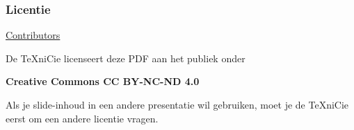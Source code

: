 \def\acrnCopyrightline#1#2#3{%
	\item Copyright (c) #2 \textbf{#1}\relax
}

\acrnPrepare

\resetul

\begin{frame}
	\frametitle{Licentie}

	\begin{center}
		\ul{Contributors}\medskip

		\adjustbox{scale=0.8,set depth={0.4\textheight}}{%
			\begin{varwidth}{25em}%
				\ttfamily
				\begin{list}{}{
					\setlength{\leftmargin}{20pt}
					\itemindent-\leftmargin
					\setlength{\itemsep}{0pt}
					\setlength{\parskip}{0pt}
				}
					\copyrightlines
				\end{list}
			\end{varwidth}%
		}
	\end{center}
	\begin{center}
		\tiny
		\vspace{-1cm}
		De \TeX niCie licenseert deze PDF aan het publiek onder

		\smallskip

		\textbf{Creative Commons CC BY-NC-ND 4.0}

		\medskip

		Als je slide-inhoud in een andere presentatie wil gebruiken, moet je de
		\TeX niCie eerst om een andere licentie vragen.
	\end{center}
\end{frame}
